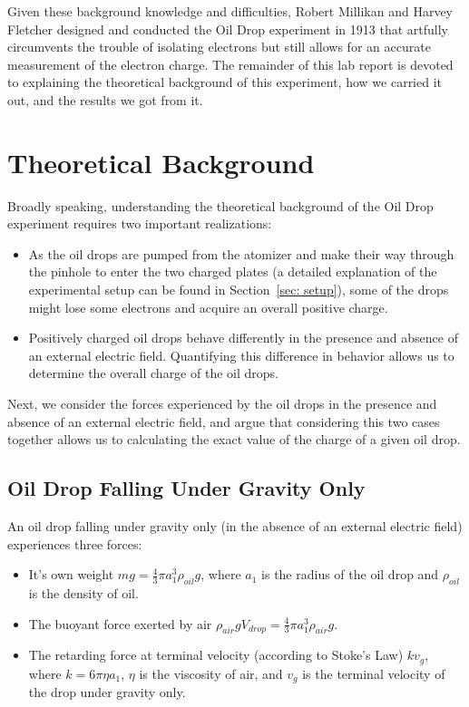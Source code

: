 \documentclass{article}
\begin{document}
Given these background knowledge and difficulties, Robert Millikan and Harvey Fletcher designed and conducted the Oil Drop experiment in 1913 that artfully circumvents the trouble of isolating electrons but still allows for an accurate measurement of the electron charge. The remainder of this lab report is devoted to explaining the theoretical background of this experiment, how we carried it out, and the results we got from it.

\section{Theoretical Background}
\label{sec: theory}
Broadly speaking, understanding the theoretical background of the Oil Drop experiment requires two important realizations: 
\begin{itemize}
    \item As the oil drops are pumped from the atomizer and make their way through the pinhole to enter the two charged plates (a detailed explanation of the experimental setup can be found in Section~\ref{sec: setup}), some of the drops might lose some electrons and acquire an overall positive charge.
    \item Positively charged oil drops behave differently in the presence and absence of an external electric field. Quantifying this difference in behavior allows us to determine the overall charge of the oil drops.
\end{itemize}

Next, we consider the forces experienced by the oil drops in the presence and absence of an external electric field, and argue that considering this two cases together allows us to calculating the exact value of the charge of a given oil drop. \cite{columbiaManual}

\subsection{Oil Drop Falling Under Gravity Only}
An oil drop falling under gravity only (in the absence of an external electric field) experiences three forces: 
\begin{itemize}
    \item It's own weight $ mg = \frac{4}{3} \pi a_1^3 \rho_{oil} g$, where $a_1$ is the radius of the oil drop and $\rho_{oil}$ is the density of oil.
    \item The buoyant force exerted by air $\rho_{air} g V_{drop} = \frac{4}{3} \pi a_1^3 \rho_{air} g$.
    \item The retarding force at terminal velocity (according to Stoke's Law) $k v_{g}$, where $k = 6 \pi \eta a_1$, $\eta$ is the viscosity of air, and $v_g$ is the terminal velocity of the drop under gravity only.
\end{itemize}
\end{document}
